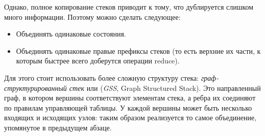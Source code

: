 Однако, полное копирование стеков приводит к тому, что дублируется слишком много информации. Поэтому можно сделать следующее:
\begin{itemize}
	\item Объединять одинаковые состояния.
	\item Объединять одинаковые правые префиксы стеков (то есть верхние их части, к которым быстрее всего доберутся операции reduce).
\end{itemize}

Для этого стоит использовать более сложную структуру стека: \textit{граф-структурированный стек} или (\textit{GSS}, Graph Structured Stack). Это направленный граф, в котором вершины соответствуют элементам стека, а ребра их соединяют по правилам управляющей таблицы. У каждой вершины может быть несколько входящих и исходящих узлов: таким образом реализуется то самое объединение, упомянутое в предыдущем абзаце.

